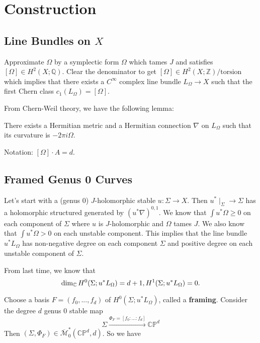 \section{Construction}

\subsection{Line Bundles on $X$}

Approximate $\Omega$ by a symplectic form $\Omega$ which tames $J$ and satisfies $[\Omega] \in H^2(X; \mathbb{Q})$. Clear the denominator to get $[\Omega] \in H^2(X; \mathbb{Z})/\text{torsion}$ which implies that there exists a $C^\infty$ complex line bundle $L_\Omega \to X$ such that the first Chern class $c_1(L_\Omega)=[\Omega]$.

From Chern-Weil theory, we have the following lemma:

\begin{lemma}

There exists a Hermitian metric and a Hermitian connection $\nabla$ on $L_\Omega$ such that its curvature is $-2\pi i \Omega$.

\end{lemma}

Notation: $[\Omega]\cdot A=d$.

\subsection{Framed Genus 0 Curves }

Let's start with a (genus $0$) $J$-holomorphic stable $u:\Sigma\to X$. Then $u^*\mid_\Sigma \to \Sigma$ has a holomorphic structured generated by $(u^*\nabla)^{0,1}$. We know that $\int u^* \Omega \ge 0$ on each component of $\Sigma$ where $u$ is $J$-holomorphic and $\Omega$ tames $J$. We also know that $\int u^*\Omega >0$ on each unstable component. This implies that the line bundle $u^*L_\Omega$ has non-negative degree on each component $\Sigma$ and positive degree on each unstable component of $\Sigma$.

From last time, we know that
\[
\dim_{\mathbb{C}} H^0(\Sigma; u^*L_\Omega)=d+1, \\
H^1(\Sigma; u^* L_\Omega) = 0.
\]

Choose a basis $F=(f_0,...,f_d)$ of $H^0(\Sigma; u^*L_\Omega)$, called a \textbf{framing}. Consider the degree $d$ genus $0$ stable map
\[
\Sigma \stackrel{\Phi_F=[f_0:...:f_d]}{\longrightarrow} \mathbb{CP}^d
\]
Then $(\Sigma, \Phi_F) \in \overline{\mathcal{M}}_0^*(\mathbb{CP}^d, d)$. So we have

